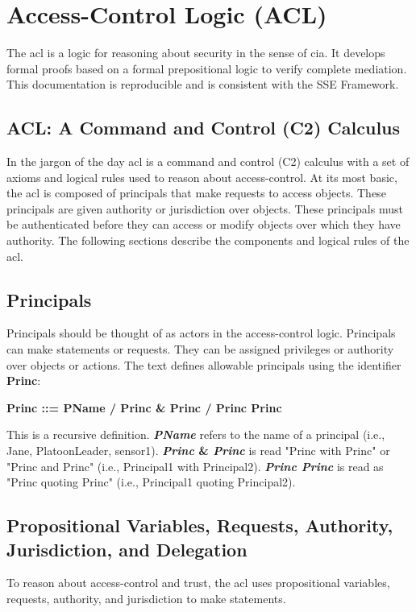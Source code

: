 \documentclass[../../main/main.tex]{subfiles}
\begin{document}
\section{Access-Control Logic (ACL)} \label{sec:acl}
The \gls{acl} is a logic for reasoning about security in the sense of \gls{cia}.  It develops formal proofs based on a formal prepositional logic to verify complete mediation.  This documentation is reproducible and is consistent with the SSE Framework.

\subsection{ACL: A Command and Control (C2) Calculus} \label{ssec:aclc2}
In the jargon of the day \gls{acl} is a command and control (C2) calculus with a set of axioms and logical rules used to reason about access-control.  At its most basic, the \gls{acl} is composed of principals that make requests to access objects.  These principals are given authority or jurisdiction over objects.  These principals must be authenticated before they can access or modify objects over which they have authority.  The following sections describe the components and logical rules of the \gls{acl}.

\subsection{Principals}\label{ssec:principals}
Principals should be thought of as actors in the access-control logic.  Principals can make statements or requests.  They can be assigned privileges or authority over objects or actions.  The text defines allowable principals using the identifier \textbf{Princ}:


\begin{center}
\textbf{Princ ::= PName / Princ \& Princ / Princ \textbar  Princ}\label{Princ}
\end{center}

This is a recursive definition. \textbf{\textit{PName}} refers to the name of a principal (i.e., Jane, PlatoonLeader, sensor1).  \textbf{\textit{Princ} \& \textit{Princ}} is read "Princ with Princ" or "Princ and Princ" (i.e., Principal1 with Principal2). \textbf{\textit{Princ \textbar  Princ}} is read as "Princ quoting Princ" (i.e., Principal1 quoting Principal2).


\subsection{Propositional Variables, Requests, Authority, Jurisdiction, and Delegation}\label{ssec:statementsacl}
To reason about access-control and trust, the \gls{acl} uses propositional variables, requests, authority, and jurisdiction to make statements.
\end{document}
